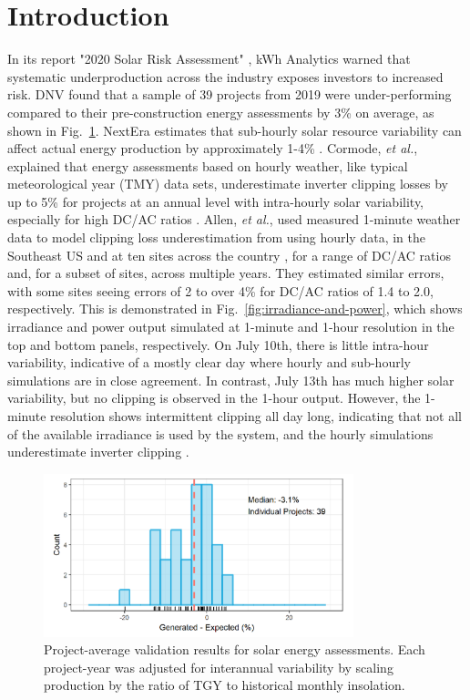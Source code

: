 \documentclass[conference]{IEEEtran}
\begin{document}
\section{Introduction}
In its report "2020 Solar Risk Assessment" \cite{Matsui2020}, kWh Analytics warned that systematic underproduction across the industry exposes investors to increased risk. DNV found that a sample of 39 projects from 2019 were under-performing compared to their pre-construction energy assessments by 3\% on average, as shown in Fig.~\ref{fig:project-underperformance}. NextEra estimates that sub-hourly solar resource variability can affect actual energy production by approximately 1-4\% \cite{Bradford}. Cormode, \textit{et al.}, explained that energy assessments based on hourly weather, like typical meteorological year (TMY) data sets, underestimate inverter clipping losses by up to 5\% for projects at an annual level with intra-hourly solar variability, especially for high DC/AC ratios \cite{Cormode2019}. Allen, \textit{et al.}, used measured 1-minute weather data to model clipping loss underestimation from using hourly data, in the Southeast US \cite{Allen2015} and at ten sites across the country \cite{Allen2018}, for a range of DC/AC ratios and, for a subset of sites, across multiple years. They estimated similar errors, with some sites seeing errors of 2 to over 4\% for DC/AC ratios of 1.4 to 2.0, respectively. This is demonstrated in Fig.~\ref{fig:irradiance-and-power}, which shows irradiance and power output simulated at 1-minute and 1-hour resolution in the top and bottom panels, respectively. On July 10th, there is little intra-hour variability, indicative of a mostly clear day where hourly and sub-hourly simulations are in close agreement. In contrast, July 13th has much higher solar variability, but no clipping is observed in the 1-hour output. However, the 1-minute resolution shows intermittent clipping all day long, indicating that not all of the available irradiance is used by the system, and the hourly simulations underestimate inverter clipping \cite{Kharait}.



\begin{figure}[htbp]
\centerline{\includegraphics[width=9cm]{fig1.png}}
\caption{Project-average validation results for solar energy assessments. Each project-year was adjusted for interannual variability by scaling production by the ratio of TGY to historical monthly insolation.}
\label{fig:project-underperformance}
\end{figure}
\end{document}
